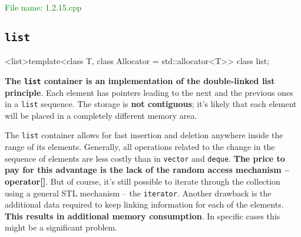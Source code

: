 \textcolor{green}{File name: 1.2.15.cpp}


\subsection{\texttt{list}} %
\begin{classinfo}
  {<list>}{template<class T, class Allocator = std::allocator<T>> class list;}
\end{classinfo}
\textbf{The \texttt{list} container is an implementation of the double-linked list principle}. 
Each element has pointers leading to the next and the previous ones in a \texttt{list} sequence. 
The storage is \textbf{not contiguous}; it’s likely that each element will be placed in a completely 
different memory area.

The \texttt{list} container allows for fast insertion and deletion anywhere inside the range of its elements.
Generally, all operations related to the change in the sequence of elements are less costly than 
in \texttt{vector} and \texttt{deque}. \textbf{The price to pay for this advantage is the lack of the 
random access mechanism – operator[]}.
But of course, it’s still possible to iterate through the collection using a general STL mechanism – 
the \texttt{iterator}.
Another drawback is the additional data required to keep linking information for each of the elements. 
\textbf{This results in additional memory consumption}. In specific cases this might be a significant problem.
